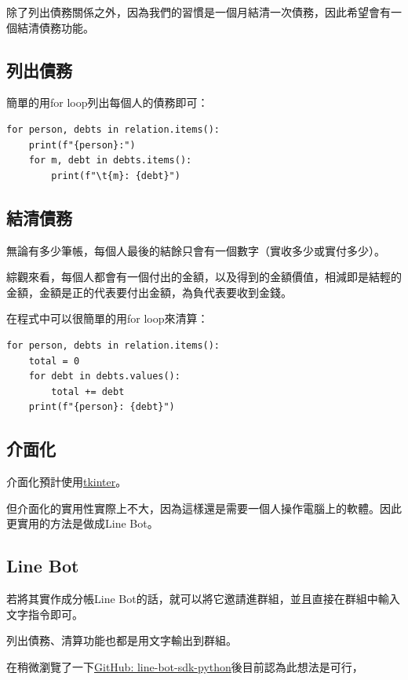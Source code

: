 \documentclass[conference]{IEEEtran}
\begin{document}
\begin{CJK*}{UTF8}{bsmi}
除了列出債務關係之外，因為我們的習慣是一個月結清一次債務，因此希望會有一個結清債務功能。

\subsection{列出債務}

簡單的用for loop列出每個人的債務即可：
\begin{lstlisting}
for person, debts in relation.items():
    print(f"{person}:")
    for m, debt in debts.items():
        print(f"\t{m}: {debt}")
\end{lstlisting}

\subsection{結清債務}\label{settle}
無論有多少筆帳，每個人最後的結餘只會有一個數字（實收多少或實付多少）。

綜觀來看，每個人都會有一個付出的金額，以及得到的金額價值，相減即是結輕的金額，金額是正的代表要付出金額，為負代表要收到金錢。

在程式中可以很簡單的用for loop來清算：

\begin{lstlisting}
for person, debts in relation.items():
    total = 0
    for debt in debts.values():
        total += debt
    print(f"{person}: {debt}")
\end{lstlisting}

\subsection{介面化}

介面化預計使用\href{https://docs.python.org/3/library/tkinter.html}{tkinter}。

但介面化的實用性實際上不大，因為這樣還是需要一個人操作電腦上的軟體。因此更實用的方法是做成Line Bot。

\subsection{Line Bot}

若將其實作成分帳Line Bot的話，就可以將它邀請進群組，並且直接在群組中輸入文字指令即可。

列出債務、清算功能也都是用文字輸出到群組。

在稍微瀏覽了一下\href{https://github.com/line/line-bot-sdk-python}{GitHub: line-bot-sdk-python}後目前認為此想法是可行，


\end{CJK*}
\end{document}

